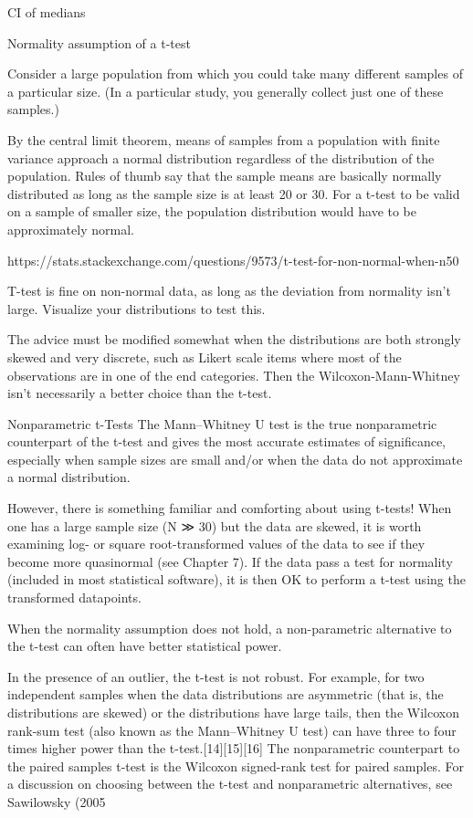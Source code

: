 \documentclass[11pt]{article}
\begin{document}
CI of medians

Normality assumption of a t-test

Consider a large population from which you could take many different
samples of a particular size. (In a particular study, you generally
collect just one of these samples.)

By the central limit theorem, means of samples from a population with
finite variance approach a normal distribution regardless of the
distribution of the population. Rules of thumb say that the sample means
are basically normally distributed as long as the sample size is at
least 20 or 30. For a t-test to be valid on a sample of smaller size,
the population distribution would have to be approximately normal.

https://stats.stackexchange.com/questions/9573/t-test-for-non-normal-when-n50

T-test is fine on non-normal data, as long as the deviation from
normality isn't large. Visualize your distributions to test this.

The advice must be modified somewhat when the distributions are both
strongly skewed and very discrete, such as Likert scale items where most
of the observations are in one of the end categories. Then the
Wilcoxon-Mann-Whitney isn't necessarily a better choice than the t-test.

Nonparametric t-Tests The Mann--Whitney U test is the true nonparametric
counterpart of the t-test and gives the most accurate estimates of
significance, especially when sample sizes are small and/or when the
data do not approximate a normal distribution.

However, there is something familiar and comforting about using t-tests!
When one has a large sample size (N ≫ 30) but the data are skewed, it is
worth examining log- or square root-transformed values of the data to
see if they become more quasinormal (see Chapter 7). If the data pass a
test for normality (included in most statistical software), it is then
OK to perform a t-test using the transformed datapoints.

When the normality assumption does not hold, a non-parametric
alternative to the t-test can often have better statistical power.

In the presence of an outlier, the t-test is not robust. For example,
for two independent samples when the data distributions are asymmetric
(that is, the distributions are skewed) or the distributions have large
tails, then the Wilcoxon rank-sum test (also known as the Mann--Whitney
U test) can have three to four times higher power than the
t-test.{[}14{]}{[}15{]}{[}16{]} The nonparametric counterpart to the
paired samples t-test is the Wilcoxon signed-rank test for paired
samples. For a discussion on choosing between the t-test and
nonparametric alternatives, see Sawilowsky (2005
\end{document}
